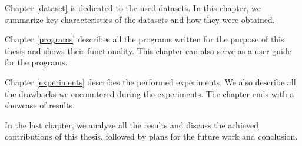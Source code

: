 Chapter \ref{dataset} is dedicated to the used datasets. In this chapter, we summarize key characteristics of the datasets and how they were obtained.

Chapter \ref{programs} describes all the programs written for the purpose of this thesis and shows their functionality. This chapter can also serve as a user guide for the programs.

Chapter \ref{experiments} describes the performed experiments. We also describe all the drawbacks we encountered during the experiments. The chapter ends with a showcase of results.

In the last chapter, we analyze all the results and discuss the achieved contributions of this thesis, followed by plans for the future work and conclusion.
